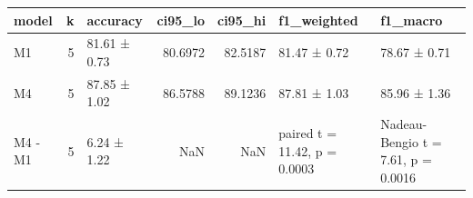 \begin{tabular}{lrlrrll}
\toprule
model & k & accuracy & ci95\_lo & ci95\_hi & f1\_weighted & f1\_macro \\
\midrule
M1 & 5 & 81.61 ± 0.73 & 80.6972 & 82.5187 & 81.47 ± 0.72 & 78.67 ± 0.71 \\
M4 & 5 & 87.85 ± 1.02 & 86.5788 & 89.1236 & 87.81 ± 1.03 & 85.96 ± 1.36 \\
M4 - M1 & 5 & 6.24 ± 1.22 & NaN & NaN & paired t = 11.42, p = 0.0003 & Nadeau-Bengio t = 7.61, p = 0.0016 \\
\bottomrule
\end{tabular}
